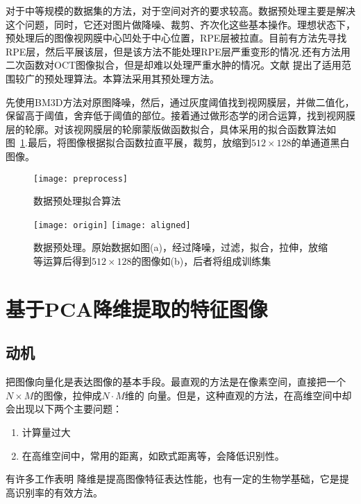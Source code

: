     对于中等规模的数据集的方法，对于空间对齐的要求较高。数据预处理主要是解决这个问题，同时，它还对图片做降噪、裁剪、齐次化这些基本操作。理想状态下，预处理后的图像视网膜中心凹处于中心位置，RPE层被拉直。目前有方法\cite{srinivasan2014fully}先寻找RPE层，然后平展该层，但是该方法不能处理RPE层严重变形的情况\cite{sun2017fully}.还有方法\cite{liu2011automated}用二次函数对OCT图像拟合，但是却难以处理严重水肿的情况。文献 提出了适用范围较广的预处理算法。本算法采用其预处理方法。

    先使用BM3D方法对原图降噪\cite{dabov2007image}，然后，通过灰度阈值找到视网膜层，并做二值化，保留高于阈值，舍弃低于阈值的部位。接着通过做形态学的闭合运算，找到视网膜层的轮廓。对该视网膜层的轮廓蒙版做函数拟合，具体采用的拟合函数算法如图~\ref{fig:preprocess}.最后，将图像根据拟合函数拉直平展，裁剪，放缩到$512\times 128$的单通道黑白图像。
    \begin{figure}[h] %
      \centering
      \texttt{[image: preprocess]}
      \caption{数据预处理拟合算法}
      \label{fig:preprocess}
    \end{figure}

    \begin{figure}[h]
      \centering%
      \subcaptionbox{\label{fig:origin}} %
        {\texttt{[image: origin]}} %
      \subcaptionbox{\label{fig:aligned}} %
        {\texttt{[image: aligned]}} \\
      \caption[数据预处理]{数据预处理。原始数据如图(a)，经过降噪，过滤，拟合，拉伸，放缩等运算后得到$512\times 128$的图像如(b)，后者将组成训练集} 
      \label{fig:origin-pre}
    \end{figure}


\section{基于PCA降维提取的特征图像}
\label{sec:pcaDR}
    \subsection{动机}
    把图像向量化是表达图像的基本手段。最直观的方法是在像素空间，直接把一个$N \times M$的图像，拉伸成$N\cdot M$维的 向量。但是，这种直观的方法，在高维空间中却会出现以下两个主要问题：
    \begin{enumerate}
        \item 计算量过大
        \item 在高维空间中，常用的距离，如欧式距离等，会降低识别性。
    \end{enumerate}
    有许多工作表明%
    降维是提高图像特征表达性能，也有一定的生物学基础\cite{olshausen1997sparse}，它是提高识别率的有效方法。
    

